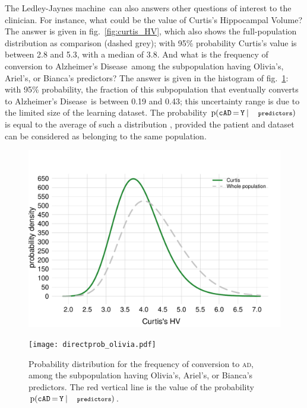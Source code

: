 \documentclass[utf8]{FrontiersinHarvard} %
\newcommand*{\mo}[1][=]{\mathord{\,#1\,}}
\newcommand*{\sects}{\S\S}%
\newcommand*{\fig}{fig.}%
\newcommand*{\eg}{{e.g.}}
\newcommand*{\p}{\mathrm{p}}%
\renewcommand*{\|}[1][]{\nonscript\:#1\vert\nonscript\:\mathopen{}}
\newcommand*{\cad}{\texttt{cAD}}
\newcommand*{\yes}{\texttt{Y}}
\newcommand*{\predictors}{\texttt{\footnotesize predictors}}
\newcommand*{\ad}{Alzheimer's Disease}
\newcommand*{\ljm}{Ledley-Jaynes machine}
\newcommand*{\AD}{\textsc{ad}}
\begin{document}
The \ljm\ can also answers other questions of interest to the clinician. For instance, what could be the value of Curtis's Hippocampal Volume? The answer is given in \fig~\ref{fig:curtis_HV}, which also shows the full-population distribution as comparison (dashed grey); with 95\% probability Curtis's value is between 2.8 and 5.3, with a median of 3.8. And what is the frequency of conversion to \ad\ among the subpopulation having Olivia's, Ariel's, or Bianca's predictors? The answer is given in the histogram of \fig~\ref{fig:freq_distribution_patients}: with 95\% probability, the fraction of this subpopulation that eventually converts to \ad\ is between 0.19 and 0.43; this uncertainty range is due to the limited size of the learning dataset. The probability $\p(\cad\mo\yes \| \predictors)$ is equal to the average of such a distribution \citep[\eg][\sects~4.2--4.3]{bernardoetal1994_r2000}, provided the patient and dataset can be considered as belonging to the same population.

  

\begin{subfigure}[t]\setcounter{subfigure}{0}
  \centering%
  \begin{minipage}[t]{0.49\linewidth}\centering
    \includegraphics[width=\linewidth]{curtis_distr_HV.pdf}
\caption{Probability distribution for Curtis's Hippocampal Volume}\label{fig:curtis_HV}
  \end{minipage}\hfill%
  \begin{minipage}[t]{0.49\linewidth}\centering
    \texttt{[image: directprob\_olivia.pdf]}
    \caption{Probability distribution for the frequency of conversion to \AD, among the subpopulation having Olivia's, Ariel's, or Bianca's predictors. The red vertical line is the value of the probability $\p(\cad\mo\yes \| \predictors)$.}\label{fig:freq_distribution_patients}
  \end{minipage}
\end{subfigure}%
\end{document}
